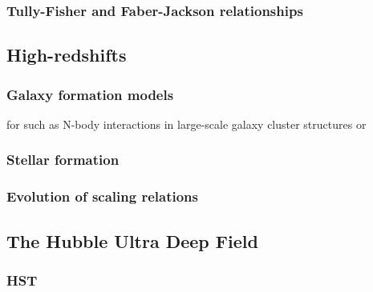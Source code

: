 \documentclass[12pt, twocolumn]{revtex4-1}    %
\begin{document}
\vspace{2ex} %
\subsubsection{Tully-Fisher and Faber-Jackson relationships}
\noindent




\subsection{High-redshifts}

\subsubsection{Galaxy formation models}

for such as N-body interactions in large-scale galaxy cluster structures or 


\subsubsection{Stellar formation}


\subsubsection{Evolution of scaling relations}


\subsection{The Hubble Ultra Deep Field}

\subsubsection{HST}
\end{document}

